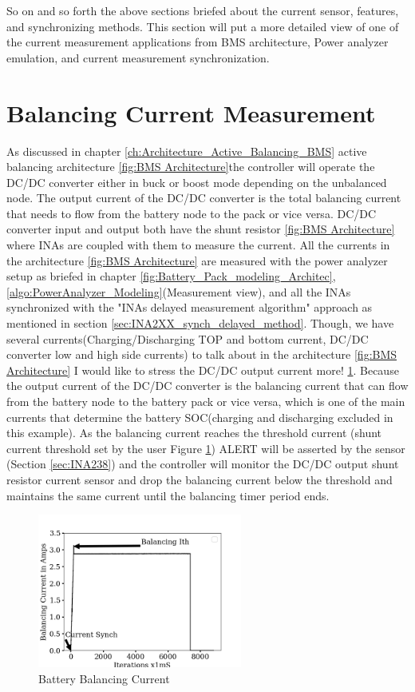 So on and so forth the above sections briefed about the current sensor, features, and synchronizing methods. This section will put a more detailed view of one of the current measurement applications from BMS architecture, Power analyzer emulation, and current measurement synchronization.

\section{Balancing Current Measurement}

As discussed in chapter \ref{ch:Architecture_Active_Balancing_BMS} active balancing architecture \ref{fig:BMS Architecture}the controller will operate the DC/DC converter either in buck or boost mode depending on the unbalanced node. The output current of the DC/DC converter is the total balancing current that needs to flow from the battery node to the pack or vice versa. DC/DC converter input and output both have the shunt resistor \ref{fig:BMS Architecture} where INAs are coupled with them to measure the current. 
All the currents in the architecture \ref{fig:BMS Architecture} are measured with the power analyzer setup as briefed in chapter \ref{fig:Battery_Pack_modeling_Architec},\ref{algo:PowerAnalyzer_Modeling}(Measurement view), and all the INAs synchronized with the "INAs delayed measurement algorithm" approach as mentioned in section \ref{sec:INA2XX_synch_delayed_method}. Though, we have several currents(Charging/Discharging TOP and bottom current, DC/DC converter low and high side currents) to talk about in the architecture \ref{fig:BMS Architecture} I would like to stress the DC/DC output current more! \ref{fig:Battery_Balancing_Current}. 
Because the output current of the DC/DC converter is the balancing current that can flow from the battery node to the battery pack or vice versa, which is one of the main currents that determine the battery SOC(charging and discharging excluded in this example). 
As the balancing current reaches the threshold current (shunt current threshold set by the user Figure \ref{fig:Battery_Balancing_Current}) ALERT will be asserted by the sensor (Section \ref{sec:INA238})  and the controller will monitor the DC/DC output shunt resistor current sensor and drop the balancing current below the threshold and maintains the same current until the balancing timer period ends. 

\begin{figure}
    \centering
    \includegraphics[width=0.6\textwidth]{Chap05/Figures/ShuntCurrent.png}
    \caption{Battery Balancing Current}
    \label{fig:Battery_Balancing_Current}
\end{figure}